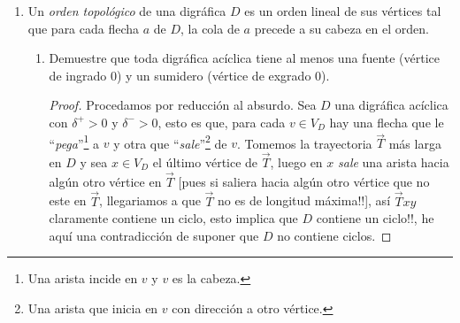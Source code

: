 \documentclass{article}
\begin{document}
\begin{enumerate}
\begin{enumerate}
\begin{proof}
        Por lo tanto, tenemos lo siguiente:
        $$|E_{G}| = 4 \cdot \left[\dfrac{n^{2} - 5n + 4}{8} \right] \longrightarrow |V_{G}| - 1 = 4 \cdot \left[\dfrac{n^{2} - 5n + 4}{8} \right]$$

        Despejando $|V_{G}|$, obtenemos:
        $$|V_{G}| - 1 = 4 \cdot \left[\dfrac{n^{2} - 5n + 4}{8} \right] \longrightarrow |V_{G}| = 4 \cdot \left[\dfrac{n^{2} - 5n + 4}{8} \right] + 1$$

        Sea $k = \left[\dfrac{n^{2} - 5n + 4}{8} \right]$. Entonces:
        $$|V_{G}| = 4 \cdot k + 1$$

        Por lo tanto, llegamos a que $|E_{G}| = |E_{\overline{G}}|$ si $|V_{G}| = 4 \cdot k + 1$. \\
      \end{proof}
  \end{enumerate}

  \item Un {\em orden topol\'ogico} de una digr\'afica $D$ es un orden lineal de
    sus v\'ertices tal que para cada flecha $a$ de $D$, la cola de $a$ precede a
    su cabeza en el orden.
    \begin{enumerate}
      \item Demuestre que toda digr\'afica ac\'iclica tiene al menos una fuente
        (v\'ertice de ingrado $0$) y un sumidero (v\'ertice de exgrado $0$).

        \begin{proof}
          Procedamos por reducci\'on al absurdo. Sea $D$ una digr\'afica ac\'iclica
          con $\delta^+ > 0$ y $\delta^- > 0$, esto es que, para cada $v \in V_D$ hay
          una flecha que le ``\textit{pega}''\footnote{Una arista incide en $v$ y $v$
            es la cabeza.} a $v$ y otra que ``\textit{sale}''\footnote{Una arista que
            inicia en $v$ con direcci\'on a otro v\'ertice.} de $v$. Tomemos la
          trayectoria $\vec{T}$ m\'as larga en $D$ y sea $x \in V_D$ el \'ultimo
          v\'ertice de $\vec{T}$, luego en $x$ \textit{sale} una arista hacia alg\'un
          otro v\'ertice en $\vec{T}$ [pues si saliera hacia alg\'un otro v\'ertice que
            no este en $\vec{T}$, llegariamos a que $\vec{T}$ no es de longitud m\'axima!!],
          as\'i $\vec{T}xy$ claramente contiene un ciclo, esto implica que $D$ contiene
          un ciclo!!, he aqu\'i una contradicci\'on de suponer que $D$ no contiene ciclos.


\end{proof}
\end{enumerate}
\end{enumerate}
\end{document}
